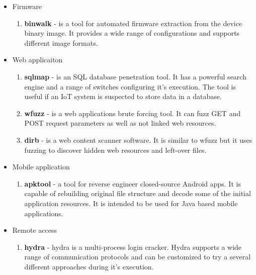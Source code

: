 	\begin{itemize}
		
		\item Firmware
		\begin{enumerate}
			\item \textbf{binwalk} - is a tool for automated firmware extraction from the device binary image. It provides a wide range of configurations and supports different image formats.
		\end{enumerate}
	
	
		\item Web applicaiton
		\begin{enumerate}[resume]
			\item \textbf{sqlmap} - is an SQL database penetration tool. It has a powerful search engine and a range of switches configuring it's execution. The tool is useful if an IoT system is suspected to store data in a database.
			\item \textbf{wfuzz} - is a web applications brute forcing tool. It can fuzz GET and POST request parameters as well as not linked web resources.
			\item \textbf{dirb} - is a web content scanner software. It is similar to wfuzz but it uses fuzzing to discover hidden web resources and left-over files. 
		\end{enumerate}
		
		\item Mobile application
		\begin{enumerate}[resume]
			\item \textbf{apktool} - a tool for reverse engineer closed-source Android apps. It is capable of rebuilding original file structure and decode some of the initial application resources. It is intended to be used for Java based mobile applications.
		\end{enumerate}
		
		\item Remote access
		\begin{enumerate}[resume]
			\item \textbf{hydra} - hydra is a multi-process login cracker. Hydra supports a wide range of communication protocols and can be customized to try a several different approaches during it's execution.
		\end{enumerate}
		

\end{itemize}
